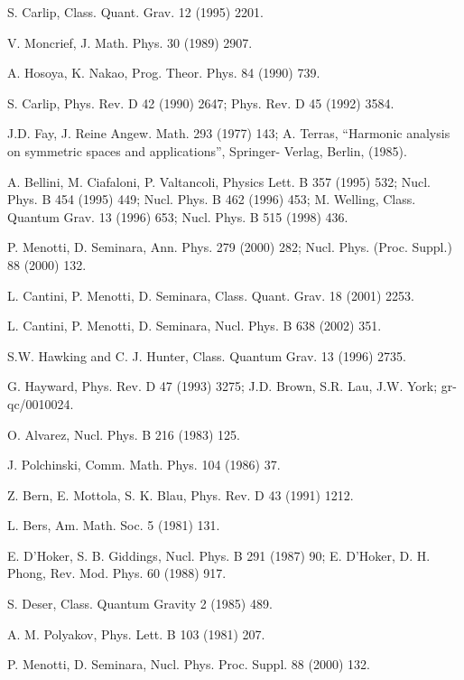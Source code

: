 \documentclass[a4paper,12pt]{article}
\begin{document}
\begin{thebibliography}{}
 
 S. Carlip, Class. Quant. Grav. 12 (1995) 2201.

 V. Moncrief, J. Math. Phys. 30 (1989) 2907.

  A. Hosoya, K. Nakao, Prog. Theor. Phys. 84 (1990) 739.

  S. Carlip, Phys. Rev. D 42 (1990) 2647;
Phys. Rev. D 45 (1992) 3584.

 J.D. Fay, J. Reine Angew. Math. 293 (1977) 143;
A. Terras, ``Harmonic analysis on symmetric spaces and applications'',
Springer- Verlag, Berlin, (1985).

 A. Bellini, M. Ciafaloni, P. Valtancoli, Physics
Lett. B 357 (1995) 532; Nucl. Phys. B 454 (1995) 449; Nucl. Phys. B
462 (1996) 453; M. Welling, Class. Quantum Grav. 13
(1996) 653; Nucl. Phys. B 515 (1998) 436.  

 P. Menotti, D. Seminara, Ann. Phys. 279 (2000) 282;
Nucl. Phys. (Proc. Suppl.) 88 (2000) 132.

 L. Cantini, P. Menotti, D. Seminara, Class. Quant. Grav. 18
(2001) 2253.
 
 L. Cantini, P. Menotti, D. Seminara, Nucl. Phys. B 638
(2002) 351.
 
 S.W. Hawking and C. J. Hunter, Class. Quantum
Grav. 13 (1996) 2735.

 G. Hayward, Phys. Rev. D 47 (1993) 3275; J.D. Brown,
S.R. Lau, J.W. York; gr-qc/0010024.

  O. Alvarez, Nucl. Phys. B 216 (1983) 125. 

  J. Polchinski, Comm. Math. Phys. 104 (1986) 37.

 Z. Bern, E. Mottola, S. K. Blau,
Phys. Rev. D 43 (1991) 1212.

  L. Bers, Am. Math. Soc. 5 (1981) 131.

 E. D'Hoker, S. B. Giddings, Nucl. Phys. B 291 (1987)
90; E. D'Hoker, D. H. Phong, Rev. Mod. Phys. 60 (1988) 917. 

 S. Deser, Class. Quantum Gravity 2 (1985) 489.

 A. M. Polyakov, Phys. Lett. B 103 (1981) 207.

 P. Menotti, D. Seminara, Nucl. Phys. Proc. Suppl. 88
(2000) 132.


\end{thebibliography}
\end{document}
